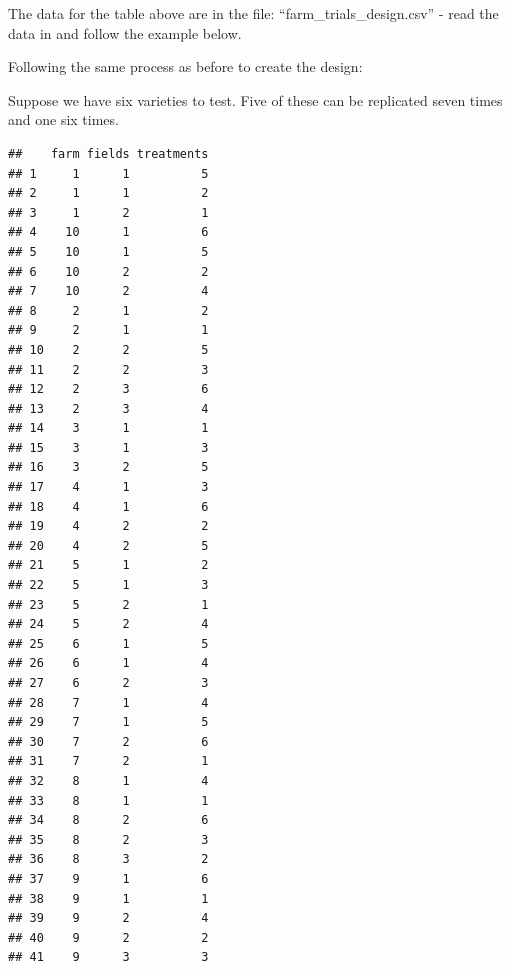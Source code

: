 \documentclass[
]{book}
\newenvironment{Shaded}{\begin{snugshade}}{\end{snugshade}}
\newcommand{\AttributeTok}[1]{\textcolor[rgb]{0.77,0.63,0.00}{#1}}
\newcommand{\DecValTok}[1]{\textcolor[rgb]{0.00,0.00,0.81}{#1}}
\newcommand{\FunctionTok}[1]{\textcolor[rgb]{0.00,0.00,0.00}{#1}}
\newcommand{\NormalTok}[1]{#1}
\newcommand{\OtherTok}[1]{\textcolor[rgb]{0.56,0.35,0.01}{#1}}
\newcommand{\SpecialCharTok}[1]{\textcolor[rgb]{0.00,0.00,0.00}{#1}}
\begin{document}
The data for the table above are in the file: ``farm\_trials\_design.csv'' - read the data in and follow the example below.

Following the same process as before to create the design:

Suppose we have six varieties to test. Five of these can be replicated seven times and one six times.

\begin{Shaded}
\end{Shaded}

\begin{verbatim}
##    farm fields treatments
## 1     1      1          5
## 2     1      1          2
## 3     1      2          1
## 4    10      1          6
## 5    10      1          5
## 6    10      2          2
## 7    10      2          4
## 8     2      1          2
## 9     2      1          1
## 10    2      2          5
## 11    2      2          3
## 12    2      3          6
## 13    2      3          4
## 14    3      1          1
## 15    3      1          3
## 16    3      2          5
## 17    4      1          3
## 18    4      1          6
## 19    4      2          2
## 20    4      2          5
## 21    5      1          2
## 22    5      1          3
## 23    5      2          1
## 24    5      2          4
## 25    6      1          5
## 26    6      1          4
## 27    6      2          3
## 28    7      1          4
## 29    7      1          5
## 30    7      2          6
## 31    7      2          1
## 32    8      1          4
## 33    8      1          1
## 34    8      2          6
## 35    8      2          3
## 36    8      3          2
## 37    9      1          6
## 38    9      1          1
## 39    9      2          4
## 40    9      2          2
## 41    9      3          3
\end{verbatim}
\end{document}

